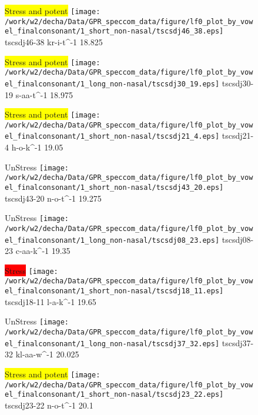 \documentclass{article}
\begin{document}
\begin{figure}[t]
\begin{minipage}[b]{.24\textwidth}
\colorbox{yellow}{Stress and potent}
\centering
\texttt{[image: /work/w2/decha/Data/GPR\_speccom\_data/figure/lf0\_plot\_by\_vowel\_finalconsonant/1\_short\_non-nasal/tscsdj46\_38.eps]}
tscsdj46-38 kr-i-t\textasciicircum-1 18.825
\end{minipage}
\begin{minipage}[b]{.24\textwidth}
\colorbox{yellow}{Stress and potent}
\centering
\texttt{[image: /work/w2/decha/Data/GPR\_speccom\_data/figure/lf0\_plot\_by\_vowel\_finalconsonant/1\_long\_non-nasal/tscsdj30\_19.eps]}
tscsdj30-19 s-aa-t\textasciicircum-1 18.975
\end{minipage}
\begin{minipage}[b]{.24\textwidth}
\colorbox{yellow}{Stress and potent}
\centering
\texttt{[image: /work/w2/decha/Data/GPR\_speccom\_data/figure/lf0\_plot\_by\_vowel\_finalconsonant/1\_short\_non-nasal/tscsdj21\_4.eps]}
tscsdj21-4 h-o-k\textasciicircum-1 19.05
\end{minipage}
\begin{minipage}[b]{.24\textwidth}
UnStress
\centering
\texttt{[image: /work/w2/decha/Data/GPR\_speccom\_data/figure/lf0\_plot\_by\_vowel\_finalconsonant/1\_short\_non-nasal/tscsdj43\_20.eps]}
tscsdj43-20 n-o-t\textasciicircum-1 19.275
\end{minipage}
\end{figure}
\clearpage
\begin{figure}[t]
\begin{minipage}[b]{.24\textwidth}
UnStress
\centering
\texttt{[image: /work/w2/decha/Data/GPR\_speccom\_data/figure/lf0\_plot\_by\_vowel\_finalconsonant/1\_long\_non-nasal/tscsdj08\_23.eps]}
tscsdj08-23 c-aa-k\textasciicircum-1 19.35
\end{minipage}
\begin{minipage}[b]{.24\textwidth}
\colorbox{red}{Stress}
\centering
\texttt{[image: /work/w2/decha/Data/GPR\_speccom\_data/figure/lf0\_plot\_by\_vowel\_finalconsonant/1\_short\_non-nasal/tscsdj18\_11.eps]}
tscsdj18-11 l-a-k\textasciicircum-1 19.65
\end{minipage}
\begin{minipage}[b]{.24\textwidth}
UnStress
\centering
\texttt{[image: /work/w2/decha/Data/GPR\_speccom\_data/figure/lf0\_plot\_by\_vowel\_finalconsonant/1\_long\_non-nasal/tscsdj37\_32.eps]}
tscsdj37-32 kl-aa-w\textasciicircum-1 20.025
\end{minipage}
\begin{minipage}[b]{.24\textwidth}
\colorbox{yellow}{Stress and potent}
\centering
\texttt{[image: /work/w2/decha/Data/GPR\_speccom\_data/figure/lf0\_plot\_by\_vowel\_finalconsonant/1\_short\_non-nasal/tscsdj23\_22.eps]}
tscsdj23-22 n-o-t\textasciicircum-1 20.1
\end{minipage}
\end{figure}
\end{document}
